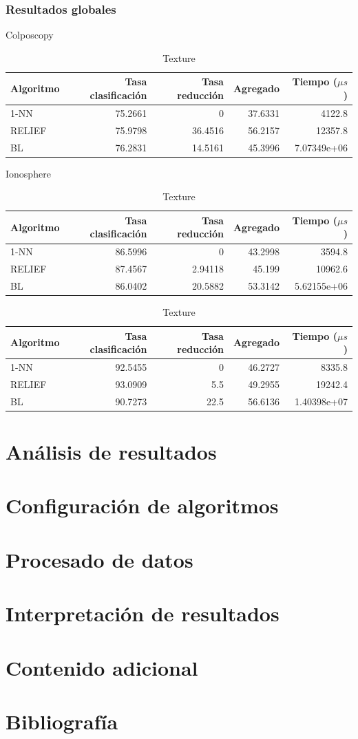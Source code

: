 \documentclass[a4paper, 17pt]{article}
\begin{document}
\subsubsection{Resultados globales}
\begin{table}[H]
  \centering
  \caption{Colposcopy}
  \begin{tabular}{lrrrr}
    \toprule
    Algoritmo & Tasa clasificación & Tasa reducción & Agregado & Tiempo ($\mu s$)\\ \midrule
    1-NN & 75.2661 & 0 & 37.6331 & 4122.8 \\
    RELIEF & 75.9798 & 36.4516 & 56.2157 & 12357.8 \\
    BL & 76.2831 & 14.5161 & 45.3996 & 7.07349e+06 \\
    \bottomrule
  \end{tabular}

  \bigskip
  \caption{Ionosphere}
  \begin{tabular}{lrrrr}
    \toprule
    Algoritmo & Tasa clasificación & Tasa reducción & Agregado & Tiempo ($\mu s$)\\ \midrule
    1-NN & 86.5996 & 0 & 43.2998 & 3594.8 \\
    RELIEF & 87.4567 & 2.94118 & 45.199 & 10962.6 \\
    BL & 86.0402 & 20.5882 & 53.3142 & 5.62155e+06 \\
    \bottomrule
  \end{tabular}

  \bigskip
  \caption{Texture}
  \begin{tabular}{lrrrr}
    \toprule
    Algoritmo & Tasa clasificación & Tasa reducción & Agregado & Tiempo ($\mu s$)\\ \midrule
    1-NN & 92.5455 & 0 & 46.2727 & 8335.8 \\
    RELIEF & 93.0909 & 5.5 & 49.2955 & 19242.4 \\
    BL & 90.7273 & 22.5 & 56.6136 & 1.40398e+07 \\
    \bottomrule
  \end{tabular}
\end{table}

\section{Análisis de resultados}


\section{Configuración de algoritmos}

\section{Procesado de datos}

\section{Interpretación de resultados}

\section{Contenido adicional}
\section{Bibliografía}
\end{document}

